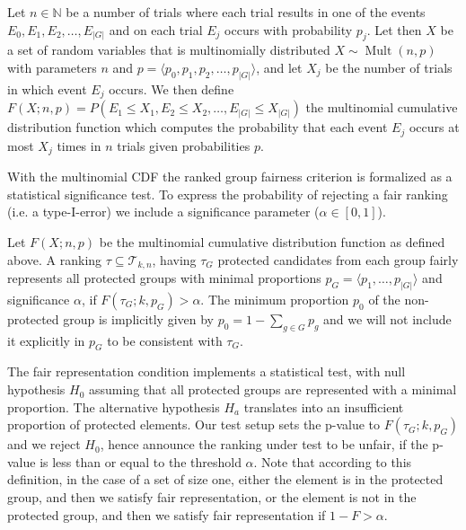 \begin{definition}
	\label{def:multinomialCDF}
	Let $ n \in \mathbb{N}$ be a number of trials where each trial results in one of the events $ E_0, E_1, E_2, \ldots, E_{|G|} $ and on each trial $ E_j $ occurs with probability $ p_j $.
	Let then $X$ %
	be a set of random variables that is multinomially distributed $ X \sim \operatorname{Mult}(n, p)$ with parameters $ n $ and $ p = \langle p_0, p_1, p_2, \ldots, p_{|G|} \rangle$, and let $ X_j $ be the number of trials in which event $ E_j $ occurs.
	We then define $ F\left(X; n, p\right) = P\left(E_1 \leq X_1, E_2 \leq X_2, \ldots, E_{|G|} \leq X_{|G|}\right)$ the multinomial cumulative distribution function which computes the probability that each event $ E_j $ occurs at most $ X_j $ times in $ n $ trials given probabilities $ p $.
\end{definition}
With the multinomial CDF the ranked group fairness criterion is formalized as a statistical significance test.
%
To express the probability of rejecting a fair ranking (i.e. a type-I-error) we include a significance parameter ($\alpha \in [0,1]$).

\begin{definition}
	\label{def:fair-representation-condition}
	Let $F(X;n,p)$ be the multinomial cumulative distribution function as defined above.
	A ranking $\tau \subseteq \mathcal{T}_{k,n}$, having $\tau_G$ protected candidates from each group fairly represents all protected groups with minimal proportions $p_G = \langle p_1, \ldots, p_{|G|}\rangle$ and significance $\alpha$,
	if $F(\tau_G;k,p_G) > \alpha$.
	The minimum proportion $p_0$ of the non-protected group is implicitly given by $p_0 = 1 - \sum_{g \in G} p_g$ and we will not include it explicitly in $p_G$ to be consistent with $\tau_G$.
\end{definition}

The fair representation condition implements a statistical test, with null hypothesis $H_0$ assuming that all protected groups are represented with a minimal proportion.
%
The alternative hypothesis $H_a$ translates into an insufficient proportion of protected elements.
%
Our test setup sets the p-value to $F(\tau_G; k, p_G)$ and we reject $H_0$, hence announce the ranking under test to be unfair, if the p-value is less than or equal to the threshold $\alpha$.
%
Note that according to this definition, in the case of a set of size one, either the element is in the protected group, and then we satisfy fair representation, or the element is not in the protected group, and then we satisfy fair representation if $1 - F > \alpha$.

